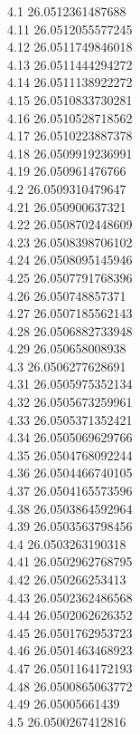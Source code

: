 {4.1	26.0512361487688\\
4.11	26.0512055577245\\
4.12	26.0511749846018\\
4.13	26.0511444294272\\
4.14	26.0511138922272\\
4.15	26.0510833730281\\
4.16	26.0510528718562\\
4.17	26.0510223887378\\
4.18	26.0509919236991\\
4.19	26.050961476766\\
4.2	26.0509310479647\\
4.21	26.050900637321\\
4.22	26.0508702448609\\
4.23	26.0508398706102\\
4.24	26.0508095145946\\
4.25	26.0507791768396\\
4.26	26.050748857371\\
4.27	26.0507185562143\\
4.28	26.0506882733948\\
4.29	26.050658008938\\
4.3	26.0506277628691\\
4.31	26.0505975352134\\
4.32	26.0505673259961\\
4.33	26.0505371352421\\
4.34	26.0505069629766\\
4.35	26.0504768092244\\
4.36	26.0504466740105\\
4.37	26.0504165573596\\
4.38	26.0503864592964\\
4.39	26.0503563798456\\
4.4	26.0503263190318\\
4.41	26.0502962768795\\
4.42	26.050266253413\\
4.43	26.0502362486568\\
4.44	26.0502062626352\\
4.45	26.0501762953723\\
4.46	26.0501463468923\\
4.47	26.0501164172193\\
4.48	26.0500865063772\\
4.49	26.05005661439\\
4.5	26.0500267412816\\
}
